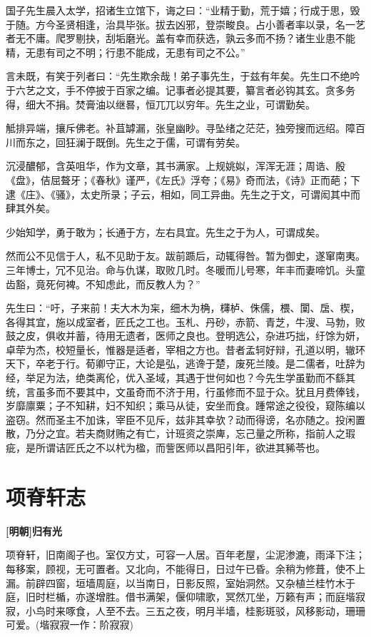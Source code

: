 \documentclass[UTF8,titlepage,oneside]{ctexbook}
\begin{document}
国子先生晨入太学，招诸生立馆下，诲之曰：“业精于勤，荒于嬉；行成于思，毁于随。方今圣贤相逢，治具毕张。拔去凶邪，登崇畯良。占小善者率以录，名一艺者无不庸。爬罗剔抉，刮垢磨光。盖有幸而获选，孰云多而不扬？诸生业患不能精，无患有司之不明；行患不能成，无患有司之不公。”


言未既，有笑于列者曰：“先生欺余哉！弟子事先生，于兹有年矣。先生口不绝吟于六艺之文，手不停披于百家之编。记事者必提其要，纂言者必钩其玄。贪多务得，细大不捐。焚膏油以继晷，恒兀兀以穷年。先生之业，可谓勤矣。


觝排异端，攘斥佛老。补苴罅漏，张皇幽眇。寻坠绪之茫茫，独旁搜而远绍。障百川而东之，回狂澜于既倒。先生之于儒，可谓有劳矣。


沉浸醲郁，含英咀华，作为文章，其书满家。上规姚姒，浑浑无涯；周诰、殷《盘》，佶屈聱牙；《春秋》谨严，《左氏》浮夸；《易》奇而法，《诗》正而葩；下逮《庄》、《骚》，太史所录；子云，相如，同工异曲。先生之于文，可谓闳其中而肆其外矣。


少始知学，勇于敢为；长通于方，左右具宜。先生之于为人，可谓成矣。


然而公不见信于人，私不见助于友。跋前踬后，动辄得咎。暂为御史，遂窜南夷。三年博士，冗不见治。命与仇谋，取败几时。冬暖而儿号寒，年丰而妻啼饥。头童齿豁，竟死何裨。不知虑此，而反教人为？”


先生曰：“吁，子来前！夫大木为杗，细木为桷，欂栌、侏儒，椳、闑、扂、楔，各得其宜，施以成室者，匠氏之工也。玉札、丹砂，赤箭、青芝，牛溲、马勃，败鼓之皮，俱收并蓄，待用无遗者，医师之良也。登明选公，杂进巧拙，纡馀为妍，卓荦为杰，校短量长，惟器是适者，宰相之方也。昔者孟轲好辩，孔道以明，辙环天下，卒老于行。荀卿守正，大论是弘，逃谗于楚，废死兰陵。是二儒者，吐辞为经，举足为法，绝类离伦，优入圣域，其遇于世何如也？今先生学虽勤而不繇其统，言虽多而不要其中，文虽奇而不济于用，行虽修而不显于众。犹且月费俸钱，岁靡廪粟；子不知耕，妇不知织；乘马从徒，安坐而食。踵常途之役役，窥陈编以盗窃。然而圣主不加诛，宰臣不见斥，兹非其幸欤？动而得谤，名亦随之。投闲置散，乃分之宜。若夫商财贿之有亡，计班资之崇庳，忘己量之所称，指前人之瑕疵，是所谓诘匠氏之不以杙为楹，而訾医师以昌阳引年，欲进其豨苓也。



\chapter*{项脊轩志}
\begin{center}
	\textbf{[明朝]归有光}
\end{center}

项脊轩，旧南阁子也。室仅方丈，可容一人居。百年老屋，尘泥渗漉，雨泽下注；每移案，顾视，无可置者。又北向，不能得日，日过午已昏。余稍为修葺，使不上漏。前辟四窗，垣墙周庭，以当南日，日影反照，室始洞然。又杂植兰桂竹木于庭，旧时栏楯，亦遂增胜。借书满架，偃仰啸歌，冥然兀坐，万籁有声；而庭堦寂寂，小鸟时来啄食，人至不去。三五之夜，明月半墙，桂影斑驳，风移影动，珊珊可爱。(堦寂寂一作：阶寂寂)
\end{document}
